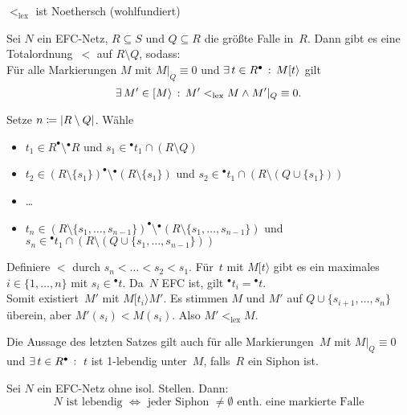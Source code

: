 \documentclass{cheat-sheet}
\newcommand{\preset}[1]{{}^\bullet{#1}} %
\newcommand{\postset}[1]{{#1}^\bullet} %
\newcommand{\activeTransition}[1]{[{#1}\rangle} %
\begin{document}
\begin{lem}
  $<_\mathrm{lex}$ ist Noethersch (wohlfundiert)
\end{lem}

\begin{lem}
  Sei $N$ ein EFC-Netz, $R \subseteq S$ und $Q \subseteq R$ die größte Falle in~$R$.
  Dann gibt es eine Totalordnung~${<}$ auf $R \setminus Q$, sodass: \\[0.2em]
  Für alle Markierungen $M$ mit $M|_Q \equiv 0$ und $\ex{t \in \postset{R}} M \activeTransition{t}$ gilt
  \[
    \ex{M' \in \activeTransition{M}} M' <_\mathrm{lex} M \wedge M'|_Q \equiv 0.
  \]
\end{lem}

\begin{beweis}
  Setze $n \coloneqq \lvert R \setminus Q\rvert$.
  Wähle
  \begin{itemize}
    \item $t_1 \in \postset{R} \setminus \preset{R}$ und $s_1 \in \preset{t_1} \cap (R \setminus Q)$
    \item $t_2 \in \postset{(R \setminus \{ s_1 \})} \setminus \preset{(R \setminus \{ s_1 \})}$ und $s_2 \in \preset{t_1} \cap (R \setminus (Q \cup \{ s_1 \}))$
    \item \ldots
    \item $t_n \in \postset{(R \setminus \{ s_1, \ldots, s_{n-1} \})} \setminus \preset{(R \setminus \{ s_1, \ldots, s_{n-1} \})}$ und $s_n \in \preset{t_1} \cap (R \setminus (Q \cup \{ s_1, \ldots, s_{n-1} \}))$
  \end{itemize}
  Definiere ${<}$ durch $s_n < \ldots < s_2 < s_1$.
  Für~$t$ mit $M \activeTransition{t}$ gibt es ein maximales $i \in \{ 1, \ldots, n \}$ mit $s_i \in \preset{t}$.
  Da~$N$ EFC ist, gilt $\preset{t_i} = \preset{t}$. \\
  Somit existiert~$M'$ mit $M \activeTransition{t_i} M'$.
  Es stimmen $M$ und $M'$ auf $Q \cup \{ s_{i+1}, \ldots, s_n \}$ überein, aber $M'(s_i) < M(s_i)$.
  Also $M' <_\mathrm{lex} M$.
\end{beweis}

\begin{kor}
  Die Aussage des letzten Satzes gilt auch für alle Markierungen~$M$ mit $M|_Q \equiv 0$ und $\ex{t \in \postset{R}}$ $t$ ist 1-lebendig unter~$M$, falls~$R$ ein Siphon ist.
\end{kor}

\begin{satz}
  Sei $N$ ein EFC-Netz ohne isol. Stellen.
  Dann:
  \[
    \text{$N$ ist lebendig $\iff$ jeder Siphon $\neq \emptyset$ enth. eine markierte Falle}
  \]
\end{satz}
\end{document}
